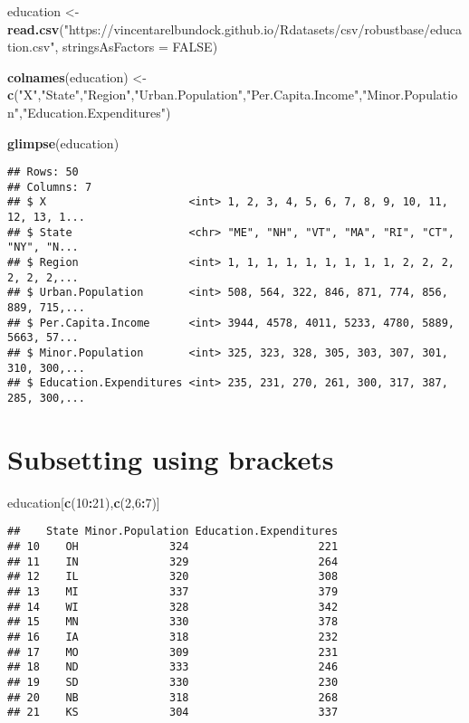 \documentclass[]{book}
\newenvironment{Shaded}{\begin{snugshade}}{\end{snugshade}}
\newcommand{\DataTypeTok}[1]{\textcolor[rgb]{0.13,0.29,0.53}{#1}}
\newcommand{\DecValTok}[1]{\textcolor[rgb]{0.00,0.00,0.81}{#1}}
\newcommand{\KeywordTok}[1]{\textcolor[rgb]{0.13,0.29,0.53}{\textbf{#1}}}
\newcommand{\NormalTok}[1]{#1}
\newcommand{\OperatorTok}[1]{\textcolor[rgb]{0.81,0.36,0.00}{\textbf{#1}}}
\newcommand{\OtherTok}[1]{\textcolor[rgb]{0.56,0.35,0.01}{#1}}
\newcommand{\StringTok}[1]{\textcolor[rgb]{0.31,0.60,0.02}{#1}}
\begin{document}
\begin{Shaded}
\begin{Highlighting}[]
\NormalTok{education <-}\StringTok{ }\KeywordTok{read.csv}\NormalTok{(}\StringTok{"https://vincentarelbundock.github.io/Rdatasets/csv/robustbase/education.csv"}\NormalTok{, }\DataTypeTok{stringsAsFactors =} \OtherTok{FALSE}\NormalTok{)}

\KeywordTok{colnames}\NormalTok{(education) <-}\StringTok{ }\KeywordTok{c}\NormalTok{(}\StringTok{"X"}\NormalTok{,}\StringTok{"State"}\NormalTok{,}\StringTok{"Region"}\NormalTok{,}\StringTok{"Urban.Population"}\NormalTok{,}\StringTok{"Per.Capita.Income"}\NormalTok{,}\StringTok{"Minor.Population"}\NormalTok{,}\StringTok{"Education.Expenditures"}\NormalTok{)}

\KeywordTok{glimpse}\NormalTok{(education)}
\end{Highlighting}
\end{Shaded}

\begin{verbatim}
## Rows: 50
## Columns: 7
## $ X                      <int> 1, 2, 3, 4, 5, 6, 7, 8, 9, 10, 11, 12, 13, 1...
## $ State                  <chr> "ME", "NH", "VT", "MA", "RI", "CT", "NY", "N...
## $ Region                 <int> 1, 1, 1, 1, 1, 1, 1, 1, 1, 2, 2, 2, 2, 2, 2,...
## $ Urban.Population       <int> 508, 564, 322, 846, 871, 774, 856, 889, 715,...
## $ Per.Capita.Income      <int> 3944, 4578, 4011, 5233, 4780, 5889, 5663, 57...
## $ Minor.Population       <int> 325, 323, 328, 305, 303, 307, 301, 310, 300,...
## $ Education.Expenditures <int> 235, 231, 270, 261, 300, 317, 387, 285, 300,...
\end{verbatim}

\hypertarget{subsetting-using-brackets}{%
\section{Subsetting using brackets}\label{subsetting-using-brackets}}

\begin{Shaded}
\begin{Highlighting}[]
\NormalTok{education[}\KeywordTok{c}\NormalTok{(}\DecValTok{10}\OperatorTok{:}\DecValTok{21}\NormalTok{),}\KeywordTok{c}\NormalTok{(}\DecValTok{2}\NormalTok{,}\DecValTok{6}\OperatorTok{:}\DecValTok{7}\NormalTok{)]}
\end{Highlighting}
\end{Shaded}

\begin{verbatim}
##    State Minor.Population Education.Expenditures
## 10    OH              324                    221
## 11    IN              329                    264
## 12    IL              320                    308
## 13    MI              337                    379
## 14    WI              328                    342
## 15    MN              330                    378
## 16    IA              318                    232
## 17    MO              309                    231
## 18    ND              333                    246
## 19    SD              330                    230
## 20    NB              318                    268
## 21    KS              304                    337
\end{verbatim}
\end{document}

